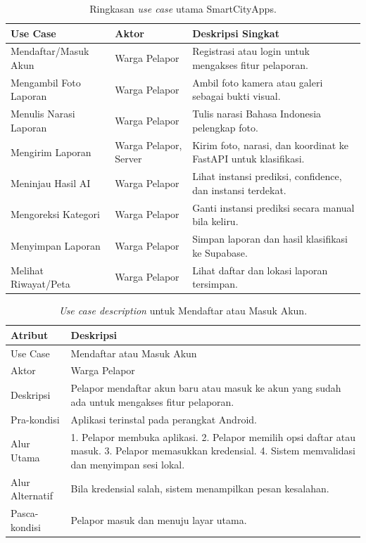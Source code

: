 \begin{table}[htbp]
\centering
\caption{Ringkasan \textit{use case} utama SmartCityApps.}
\label{tab:uc-ringkas}
\begin{tabular}{p{4.0cm} p{2.8cm} p{5.2cm}}
\toprule
\textbf{Use Case} & \textbf{Aktor} & \textbf{Deskripsi Singkat} \\
\midrule
Mendaftar/Masuk Akun & Warga Pelapor & Registrasi atau login untuk mengakses fitur pelaporan. \\
Mengambil Foto Laporan & Warga Pelapor & Ambil foto kamera atau galeri sebagai bukti visual. \\
Menulis Narasi Laporan & Warga Pelapor & Tulis narasi Bahasa Indonesia pelengkap foto. \\
Mengirim Laporan & Warga Pelapor, Server & Kirim foto, narasi, dan koordinat ke FastAPI untuk klasifikasi. \\
Meninjau Hasil AI & Warga Pelapor & Lihat instansi prediksi, confidence, dan instansi terdekat. \\
Mengoreksi Kategori & Warga Pelapor & Ganti instansi prediksi secara manual bila keliru. \\
Menyimpan Laporan & Warga Pelapor & Simpan laporan dan hasil klasifikasi ke Supabase. \\
Melihat Riwayat/Peta & Warga Pelapor & Lihat daftar dan lokasi laporan tersimpan. \\
\bottomrule
\end{tabular}
\end{table}

\begin{table}[htbp]
\centering
\caption{\textit{Use case description} untuk Mendaftar atau Masuk Akun.}
\label{tab:uc-auth}
\begin{tabular}{p{3.5cm} p{9cm}}
\toprule
\textbf{Atribut} & \textbf{Deskripsi} \\
\midrule
Use Case & Mendaftar atau Masuk Akun \\
Aktor & Warga Pelapor \\
Deskripsi & Pelapor mendaftar akun baru atau masuk ke akun yang sudah ada untuk mengakses fitur pelaporan. \\
Pra-kondisi & Aplikasi terinstal pada perangkat Android. \\
Alur Utama & 1. Pelapor membuka aplikasi. 2. Pelapor memilih opsi daftar atau masuk. 3. Pelapor memasukkan kredensial. 4. Sistem memvalidasi dan menyimpan sesi lokal. \\
Alur Alternatif & Bila kredensial salah, sistem menampilkan pesan kesalahan. \\
Pasca-kondisi & Pelapor masuk dan menuju layar utama. \\
\bottomrule
\end{tabular}
\end{table}

